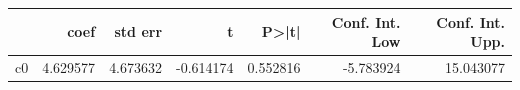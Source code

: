 \begin{tabular}{lrrrrrr}
\toprule
 & coef & std err & t & P>|t| & Conf. Int. Low & Conf. Int. Upp. \\
\midrule
c0 & 4.629577 & 4.673632 & -0.614174 & 0.552816 & -5.783924 & 15.043077 \\
\bottomrule
\end{tabular}